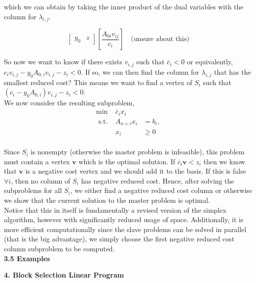 \documentclass[11pt]{article}
\begin{document}
\noindent which we can obtain by taking the inner product of the dual variables with the column for $\lambda_{i, j}$.

$$\left[\begin{array}{ll}
    y_0 & z 
    \end{array} \right]\left[\frac{A_{0 i} v_{i j}}{c_i}\right] \quad \text{(unsure about this)}
    $$

\noindent So now we want to know if there exists $v_{i, j}$ such that $\bar{c}_i < 0$ or equivalently, $c_i v_{i, j} - y_0 A_{0, i} v_{i, j} - z_i < 0$. If so, we can then find the column for $\lambda_{i, j}$ that has the smallest reduced cost? This means we want to find a vertex of $S_i$ such that $(c_i - y_0 A_{0, i}) v_{i, j} - z_i < 0$.
\\

\noindent We now consider the resulting subproblem,
\\
$$
\begin{array}{rcl}
    \min & \bar{c}_i x_i & \\
    \text { s.t. } & A_{n+i} x_i & =b_i, \\
    & x_i & \geq 0
\end{array}
$$
\\

\noindent Since $S_i$ is nonempty (otherwise the master problem is infeasible), this problem must contain a vertex $\textbf{v}$ which is the optimal solution. If $\bar{c}_i\textbf{v}<z_i$ then we know that $\textbf{v}$ is a negative cost vertex and we should add it to the basis. If this is false $\forall i$, then no column of $S_i$ has negative reduced cost. Hence, after solving the subproblems for all $S_i$, we either find a negative reduced cost column or otherwise we show that the current solution to the master problem is optimal.
\\

\noindent Notice that this in itself is fundamentally a revised version of the simplex algorithm, however with significantly reduced usage of space. Additionally, it is more efficient computationally since the slave problems can be solved in parallel (that is the big advantage), we simply choose the first negative reduced cost column subproblem to be computed.
\\


\noindent \textbf{3.5 Examples}
\\

\newpage

\noindent \textbf{\large{4. Block Selection Linear Program}} \\
\end{document}
